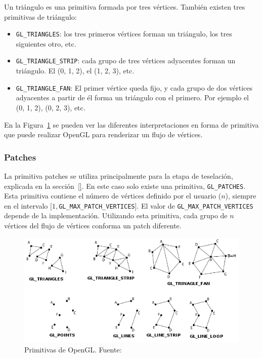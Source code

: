Un triángulo es una primitiva formada por tres vértices. También existen tres
primitivas de triángulo:

\begin{itemize}
		\item \verb|GL_TRIANGLES|: los tres primeros vértices forman un
				triángulo, los tres siguientes otro, etc.
		\item \verb|GL_TRIANGLE_STRIP|: cada grupo de tres vértices adyacentes
				forman un triángulo. El (0, 1, 2), el (1, 2, 3), etc.
		\item \verb|GL_TRIANGLE_FAN|: El primer vértice queda fijo, y cada grupo
				de dos vértices adyacentes a partir de él forma un triángulo con
				el primero. Por ejemplo el (0, 1, 2), (0, 2, 3), etc.
\end{itemize}

En la Figura~\ref{fig:primitives} se pueden ver las diferentes interpretaciones
en forma de primitiva que puede realizar OpenGL para renderizar un flujo de
vértices. 

\subsubsection{Patches}
\label{ref:patches}

La primitiva patches se utiliza principalmente para la etapa de teselación,
explicada en la sección~\ref{}. En este caso solo existe una primitiva,
\verb|GL_PATCHES|. Esta primitiva contiene el número de vértices definido por el
usuario ($n$), siempre en el intervalo $[1,$\verb|GL_MAX_PATCH_VERTICES|$]$. El
valor de \verb|GL_MAX_PATCH_VERTICES| depende de la implementación. Utilizando
esta primitiva, cada grupo de $n$ vértices del flujo de vértices conforma un
patch diferente.

\begin{figure}[h]
	\centering	
	\includegraphics[width=\textwidth]{figures/primitives.png}
	\caption[Primitivas de OpenGL]{Primitivas de OpenGL.
	Fuente:~\cite{PrimitiveImage}}
	\label{fig:primitives}
\end{figure}

